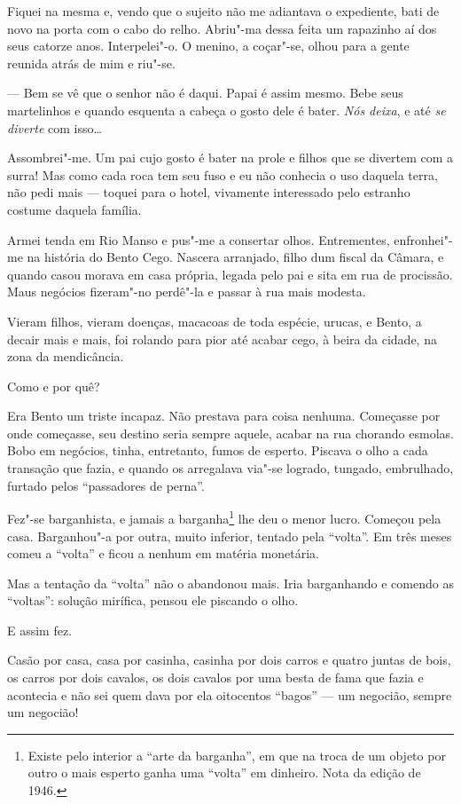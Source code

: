 Fiquei na mesma e, vendo que o sujeito não me adiantava o expediente,
bati de novo na porta com o cabo do relho. Abriu"-ma dessa feita um
rapazinho aí dos seus catorze anos. Interpelei"-o. O menino, a coçar"-se,
olhou para a gente reunida atrás de mim e riu"-se.

--- Bem se vê que o senhor não é daqui. Papai é assim mesmo. Bebe seus
martelinhos e quando esquenta a cabeça o gosto dele é bater. \emph{Nós
deixa}, e até \emph{se diverte} com isso\ldots{}

Assombrei"-me. Um pai cujo gosto é bater na prole e filhos que se
divertem com a surra! Mas como cada roca tem seu fuso e eu não conhecia
o uso daquela terra, não pedi mais --- toquei para o hotel, vivamente
interessado pelo estranho costume daquela família.

Armei tenda em Rio Manso e pus"-me a consertar olhos. Entrementes,
enfronhei"-me na história do Bento Cego. Nascera arranjado, filho dum
fiscal da Câmara, e quando casou morava em casa própria, legada pelo pai
e sita em rua de procissão. Maus negócios fizeram"-no perdê"-la e passar à
rua mais modesta.

Vieram filhos, vieram doenças, macacoas de toda espécie, urucas, e
Bento, a decair mais e mais, foi rolando para pior até acabar cego, à
beira da cidade, na zona da mendicância.

Como e por quê?

Era Bento um triste incapaz. Não prestava para coisa nenhuma. Começasse
por onde começasse, seu destino seria sempre aquele, acabar na rua
chorando esmolas. Bobo em negócios, tinha, entretanto, fumos de esperto.
Piscava o olho a cada transação que fazia, e quando os arregalava via"-se
logrado, tungado, embrulhado, furtado pelos ``passadores de perna''.

Fez"-se barganhista, e jamais a barganha\footnote{Existe pelo interior a
  ``arte da barganha'', em que na troca de um objeto por outro o mais
  esperto ganha uma ``volta'' em dinheiro. Nota da edição de 1946.} lhe
deu o menor lucro. Começou pela casa. Barganhou"-a por outra, muito
inferior, tentado pela ``volta''. Em três meses comeu a ``volta'' e
ficou a nenhum em matéria monetária.

Mas a tentação da ``volta'' não o abandonou mais. Iria barganhando e
comendo as ``voltas'': solução mirífica, pensou ele piscando o olho.

E assim fez.

Casão por casa, casa por casinha, casinha por dois carros e quatro
juntas de bois, os carros por dois cavalos, os dois cavalos por uma
besta de fama que fazia e acontecia e não sei quem dava por ela
oitocentos ``bagos'' --- um negocião, sempre um negocião!

